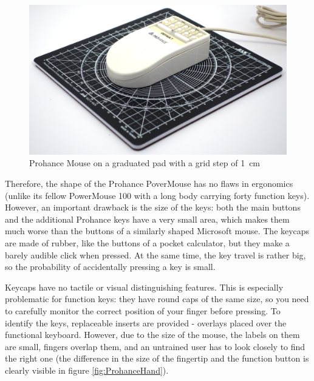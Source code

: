 \documentclass[11pt, a4paper]{article}
\begin{document}
\begin{figure}[h]
    \centering
    \includegraphics[scale=0.4]{1989_prohance_powermouse/size_30.jpg}
    \caption{Prohance Mouse on a graduated pad with a grid step of 1~cm}
    \label{fig:ProhanceSize}
\end{figure}

Therefore, the shape of the Prohance PoverMouse has no flaws in ergonomics (unlike its fellow PowerMouse 100 with a long body carrying forty function keys). However, an important drawback is the size of the keys: both the main buttons and the additional Prohance keys have a very small area, which makes them much worse than the buttons of a similarly shaped Microsoft mouse. The keycaps are made of rubber, like the buttons of a pocket calculator, but they make a barely audible click when pressed. At the same time, the key travel is rather big, so the probability of accidentally pressing a key is small.

Keycaps have no tactile or visual distinguishing features. This is especially problematic for function keys: they have round caps of the same size, so you need to carefully monitor the correct position of your finger before pressing. To identify the keys, replaceable inserts are provided - overlays placed over the functional keyboard. However, due to the size of the mouse, the labels on them are small, fingers overlap them, and an untrained user has to look closely to find the right one (the difference in the size of the fingertip and the function button is clearly visible in figure \ref{fig:ProhanceHand}).
\end{document}
